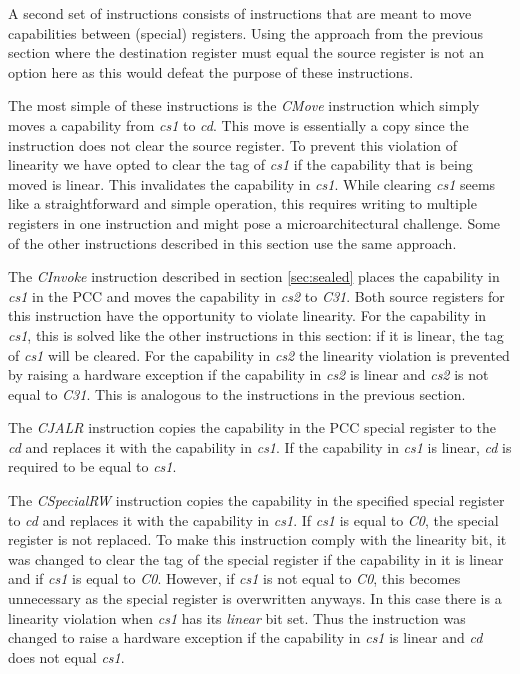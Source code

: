 A second set of instructions consists of instructions that are meant to move capabilities between (special) registers. Using the approach from the previous section where the destination register must equal the source register is not an option here as this would defeat the purpose of these instructions.

The most simple of these instructions is the \textit{CMove} instruction which simply moves a capability from \textit{cs1} to \textit{cd}. This move is essentially a copy since the instruction does not clear the source register. To prevent this violation of linearity we have opted to clear the tag of \textit{cs1} if the capability that is being moved is linear. This invalidates the capability in \textit{cs1}. While clearing  \textit{cs1} seems like a straightforward and simple operation, this requires writing to multiple registers in one instruction and might pose a microarchitectural challenge. Some of the other instructions described in this section use the same approach.

The \textit{CInvoke} instruction described in section \ref{sec:sealed} places the capability in \textit{cs1} in the PCC and moves the capability in \textit{cs2} to \textit{C31}. Both source registers for this instruction have the opportunity to violate linearity. For the capability in \textit{cs1}, this is solved like the other instructions in this section: if it is linear, the tag of \textit{cs1} will be cleared. For the capability in \textit{cs2} the linearity violation is prevented by raising a hardware exception if the capability in \textit{cs2} is linear and \textit{cs2} is not equal to \textit{C31}. This is analogous to the instructions in the previous section.

The \textit{CJALR} instruction copies the capability in the PCC special register to the \textit{cd} and replaces it with the capability in \textit{cs1}. If the capability in \textit{cs1} is linear, \textit{cd} is required to be equal to \textit{cs1}.

The \textit{CSpecialRW} instruction copies the capability in the specified special register to \textit{cd} and replaces it with the capability in \textit{cs1}. If \textit{cs1} is equal to \textit{C0}, the special register is not replaced. To make this instruction comply with the linearity bit, it was changed to clear the tag of the special register if the capability in it is linear and if \textit{cs1} is equal to \textit{C0}. However, if \textit{cs1} is not equal to \textit{C0}, this becomes unnecessary as the special register is overwritten anyways. In this case there is a linearity violation when \textit{cs1} has its \textit{linear} bit set. Thus the instruction was changed to raise a hardware exception if the capability in  \textit{cs1} is linear and \textit{cd} does not equal \textit{cs1}.

